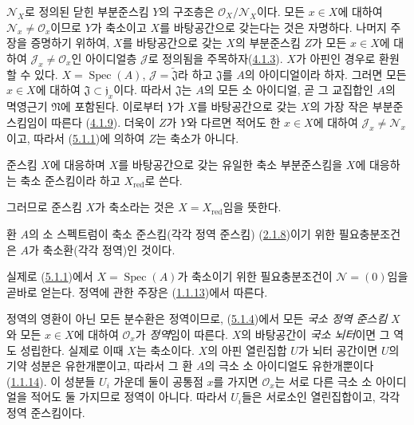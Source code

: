 $\mathscr{N}_X$로 정의된 닫힌 부분준스킴 $Y$의 구조층은
$\mathscr{O}_X/\mathscr{N}_X$이다. 모든 $x\in X$에 대하여
$\mathscr{N}_x\ne\mathscr{O}_x$이므로 $Y$가 축소이고 $X$를
바탕공간으로 갖는다는 것은 자명하다. 나머지 주장을 증명하기 위하여,
$X$를 바탕공간으로 갖는 $X$의 부분준스킴 $Z$가 모든 $x\in X$에
대하여 $\mathscr{J}_x\ne\mathscr{O}_x$인 아이디얼층 $\mathscr{J}$로
정의됨을 주목하자(\hyperref[I.4.1.3-ko]{4.1.3}). $X$가 아핀인 경우로
환원할 수 있다. $X=\operatorname{Spec}(A)$,
$\mathscr{J}=\widetilde{\mathfrak{J}}$라 하고 $\mathfrak{J}$를 $A$의
아이디얼이라 하자. 그러면 모든 $x\in X$에 대하여
$\mathfrak{J}\subset\mathfrak{j}_x$이다. 따라서 $\mathfrak{J}$는
$A$의 모든 소 아이디얼, 곧 그 교집합인 $A$의 멱영근기
$\mathfrak{N}$에 포함된다. 이로부터 $Y$가 $X$를 바탕공간으로 갖는
$X$의 가장 작은 부분준스킴임이 따른다
(\hyperref[I.4.1.9-ko]{4.1.9}). 더욱이 $Z$가 $Y$와 다르면 적어도 한
$x\in X$에 대하여 $\mathscr{J}_x\ne\mathscr{N}_x$이고, 따라서
(\hyperref[I.5.1.1-ko]{5.1.1})에 의하여 $Z$는 축소가 아니다.

\begin{definition}[5.1.3]
\label{I.5.1.3-ko}
준스킴 $X$에 대응하며 $X$를 바탕공간으로 갖는 유일한 축소
부분준스킴을 $X$에 대응하는 축소 준스킴이라 하고
$X_{\mathrm{red}}$로 쓴다.
\end{definition}

그러므로 준스킴 $X$가 축소라는 것은 $X=X_{\mathrm{red}}$임을 뜻한다.

\begin{proposition}[5.1.4]
\label{I.5.1.4-ko}
환 $A$의 소 스펙트럼이 축소 준스킴(각각 정역 준스킴)
(\hyperref[I.2.1.8-ko]{2.1.8})이기 위한 필요충분조건은 $A$가
축소환(각각 정역)인 것이다.
\end{proposition}

실제로 (\hyperref[I.5.1.1-ko]{5.1.1})에서
$X=\operatorname{Spec}(A)$가 축소이기 위한 필요충분조건이
$\mathscr{N}=(0)$임을 곧바로 얻는다. 정역에 관한 주장은
(\hyperref[I.1.1.13-ko]{1.1.13})에서 따른다.

정역의 영환이 아닌 모든 분수환은 정역이므로,
(\hyperref[I.5.1.4-ko]{5.1.4})에서 모든 \emph{국소 정역 준스킴}
$X$와 모든 $x\in X$에 대하여 $\mathscr{O}_x$가 \emph{정역}임이
따른다. $X$의 바탕공간이 \emph{국소 뇌터}이면 그 역도 성립한다.
실제로 이때 $X$는 축소이다. $X$의 아핀 열린집합 $U$가 뇌터 공간이면
$U$의 기약 성분은 유한개뿐이고, 따라서 그 환 $A$의 극소 소
아이디얼도 유한개뿐이다(\hyperref[I.1.1.14-ko]{1.1.14}). 이 성분들
$U_i$ 가운데 둘이 공통점 $x$를 가지면 $\mathscr{O}_x$는 서로 다른
극소 소 아이디얼을 적어도 둘 가지므로 정역이 아니다. 따라서
$U_i$들은 서로소인 열린집합이고, 각각 정역 준스킴이다.

